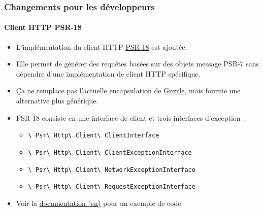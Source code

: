 
\begin{frame}[fragile]
	\frametitle{Changements pour les développeurs}
	\framesubtitle{Client HTTP PSR-18}

	\begin{itemize}
		\item L'implémentation du client HTTP
			\href{https://www.php-fig.org/psr/psr-18/}{PSR-18} est ajoutée.
		\item Elle permet de générer des requêtes basées sur des objets message
			PSR-7 sans dépendre d'une implémentation de client HTTP spécifique.
		\item Ça ne remplace pas l'actuelle encapsulation de \href{http://guzzlephp.org/}{Guzzle},
			mais fournie une alternative plus générique.
		\item PSR-18 consiste en une interface de client et trois interfaces d'exception~:

			\begin{itemize}\smaller
				\item \texttt{\textbackslash
					Psr\textbackslash
					Http\textbackslash
					Client\textbackslash
					ClientInterface}
				\item \texttt{\textbackslash
					Psr\textbackslash
					Http\textbackslash
					Client\textbackslash
					ClientExceptionInterface}
				\item \texttt{\textbackslash
					Psr\textbackslash
					Http\textbackslash
					Client\textbackslash
					NetworkExceptionInterface}
				\item \texttt{\textbackslash
					Psr\textbackslash
					Http\textbackslash
					Client\textbackslash
					RequestExceptionInterface}
			\end{itemize}\normalsize

		\item Voir la
			\href{https://docs.typo3.org/c/typo3/cms-core/master/en-us/Changelog/10.1/Feature-89216-PSR-18HTTPClientImplementation.html}{documentation (en)}
			pour un exemple de code.

	\end{itemize}

\end{frame}


